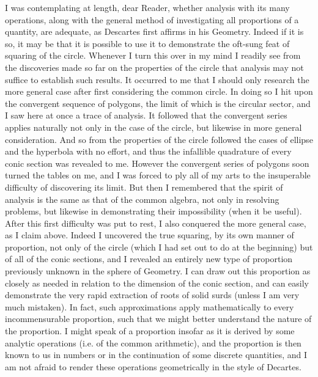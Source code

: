 \documentclass[11pt,letterpaper]{book}
\begin{document}
I was contemplating at length, dear Reader, whether analysis with its many
operations, along with the general method of investigating all proportions of a
quantity, are adequate, as Descartes first affirms in his Geometry. Indeed
if it is so, it may be that it is possible to use it to demonstrate the
oft-sung feat of squaring of the circle. Whenever I turn this over in my mind I
readily see from the discoveries made so far on the properties of the circle
that analysis may not suffice to establish such results. It occurred to me that
I should only research the more general case after first considering the common
circle. In doing so I hit upon the convergent sequence of polygons, the limit of
which is the circular sector, and I saw here at once a trace of analysis. It
followed that the convergent series applies naturally not only in the case of
the circle, but likewise in more general consideration. And so from the
properties of the circle followed the cases of ellipse and the hyperbola with no
effort, and thus the infallible quadrature of every conic section was revealed
to me. However the convergent series of polygons soon turned the tables on me,
and I was forced to ply all of my arts to the insuperable difficulty of
discovering its limit. But then I remembered that the spirit of analysis is the
same as that of the common algebra, not only in resolving problems, but likewise
in demonstrating their impossibility (when it be useful). After this first
difficulty was put to rest, I also conquered the more general case, as I claim
above. Indeed I uncovered the true squaring, by its own manner of proportion,
not only of the circle (which I had set out to do at the beginning) but of all
of the conic sections, and I revealed an entirely new type of proportion
previously unknown in the sphere of Geometry. I can draw out this proportion as
closely as needed in relation to the dimension of the conic section, and can
easily demonstrate the very rapid extraction of roots of solid surds (unless I
am very much mistaken). In fact, such approximations apply mathematically to
every incommensurable proportion, such that we might better understand the
nature of the proportion. I might speak of a proportion insofar as it is
derived by some analytic operations (i.e. of the common arithmetic), and the
proportion is then known to us in numbers or in the continuation of some
discrete quantities, and I am not afraid to render these operations
geometrically in the style of Decartes.
\end{document}
